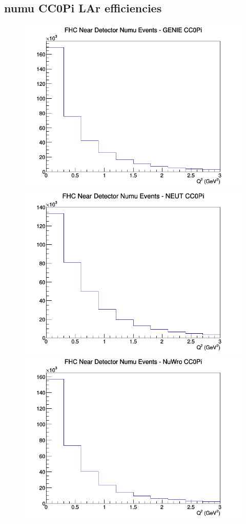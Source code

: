 \subsection{numu CC0Pi LAr efficiencies}
\begin{figure}[h]
\includegraphics[width=\linewidth]{eff_Q2/LAr/CC0Pi_FHC_ND_numu_Q2_GENIE.png}
\endminipage
{}
\includegraphics[width=\linewidth]{eff_Q2/LAr/CC0Pi_FHC_ND_numu_Q2_NEUT.png}
\endminipage
{}
\includegraphics[width=\linewidth]{eff_Q2/LAr/CC0Pi_FHC_ND_numu_Q2_NuWro.png}

\end{figure}
